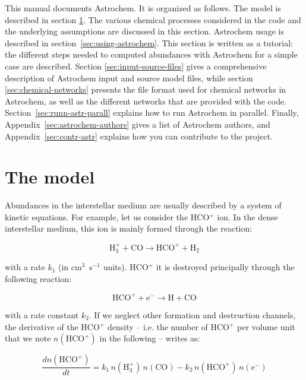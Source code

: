 \documentclass[a4paper,12pt]{article}
\newcommand{\conc}[1]{n(\mathrm{#1})}
\begin{document}
This manual documents Astrochem. It is organized as follows. The model
is described in section \ref{sec:model}. The various chemical
processes considered in the code and the underlying assumptions are
discussed in this section. Astrochem usage is described in
section~\ref{sec:using-astrochem}. This section is written as a
tutorial: the different steps needed to computed abundances with
Astrochem for a simple case are described. Section
\ref{sec:input-source-files} gives a comprehensive description of
Astrochem input and source model files, while section
\ref{sec:chemical-networks} presents the file format used for chemical
networks in Astrochem, as well as the different networks that are
provided with the code. Section~\ref{sec:runn-astr-parall} explains
how to run Astrochem in parallel. Finally,
Appendix~\ref{sec:astrochem-authors} gives a list of Astrochem
authors, and Appendix~\ref{sec:contr-astr} explains how you can
contribute to the project.

\section{The model}
\label{sec:model}

Abundances in the interstellar medium are usually described by a
system of kinetic equations. For example, let us consider the
HCO$^{+}$ ion. In the dense interstellar medium, this ion is mainly
formed through the reaction:

\begin{equation}
  \mathrm{H_{3}^{+} + CO \rightarrow HCO^{+} + H_{2}}
  \label{eq:hcop-formation}
\end{equation}

\noindent
with a rate $k_{1}$ (in cm$^{3}$~s$^{-1}$ units). HCO$^{+}$ it is
destroyed principally through the following reaction:

\begin{equation}
  \mathrm{HCO^{+} + e^{-} \rightarrow H + CO}
  \label{eq:hcop-destruction}
\end{equation}

\noindent
with a rate constant $k_{2}$. If we neglect other formation and
destruction channels, the derivative of the HCO$^{+}$ density --
i.e. the number of HCO$^{+}$ per volume unit that we note
$\conc{HCO^{+}}$ in the following -- writes as:

\begin{equation}
  \frac{d\conc{HCO^{+}}}{dt} = k_{1} \, \conc{H_{3}^{+}} \, \conc{CO}
  - k_{2} \, \conc{HCO^{+}} \, \conc{e^{-}}
\end{equation}
\end{document}
